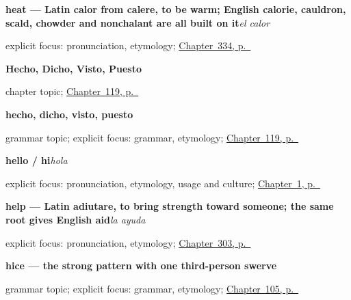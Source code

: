 \noindent\begin{minipage}[t]{\linewidth}
\raggedright
\textbf{heat — Latin calor from calere, to be warm; English calorie, cauldron, scald, chowder and nonchalant are all built on it}\enspace\emph{el calor}\par
\footnotesize explicit focus: pronunciation, etymology; \hyperref[ch:salud-y-edad]{Chapter~334, p.~\pageref*{ch:salud-y-edad}}
\end{minipage}\par\smallskip

\noindent\begin{minipage}[t]{\linewidth}
\raggedright
\textbf{Hecho, Dicho, Visto, Puesto}\par
\footnotesize chapter topic; \hyperref[ch:irregular-participles]{Chapter~119, p.~\pageref*{ch:irregular-participles}}
\end{minipage}\par\smallskip

\noindent\begin{minipage}[t]{\linewidth}
\raggedright
\textbf{hecho, dicho, visto, puesto}\par
\footnotesize grammar topic; explicit focus: grammar, etymology; \hyperref[ch:irregular-participles]{Chapter~119, p.~\pageref*{ch:irregular-participles}}
\end{minipage}\par\smallskip

\noindent\begin{minipage}[t]{\linewidth}
\raggedright
\textbf{hello / hi}\enspace\emph{hola}\par
\footnotesize explicit focus: pronunciation, etymology, usage and culture; \hyperref[ch:first-words]{Chapter~1, p.~\pageref*{ch:first-words}}
\end{minipage}\par\smallskip

\noindent\begin{minipage}[t]{\linewidth}
\raggedright
\textbf{help — Latin adiutare, to bring strength toward someone; the same root gives English aid}\enspace\emph{la ayuda}\par
\footnotesize explicit focus: pronunciation, etymology; \hyperref[ch:reparaciones]{Chapter~303, p.~\pageref*{ch:reparaciones}}
\end{minipage}\par\smallskip

\noindent\begin{minipage}[t]{\linewidth}
\raggedright
\textbf{hice — the strong pattern with one third-person swerve}\par
\footnotesize grammar topic; explicit focus: grammar, etymology; \hyperref[ch:spanish-preterito-fuerte]{Chapter~105, p.~\pageref*{ch:spanish-preterito-fuerte}}
\end{minipage}\par\smallskip

